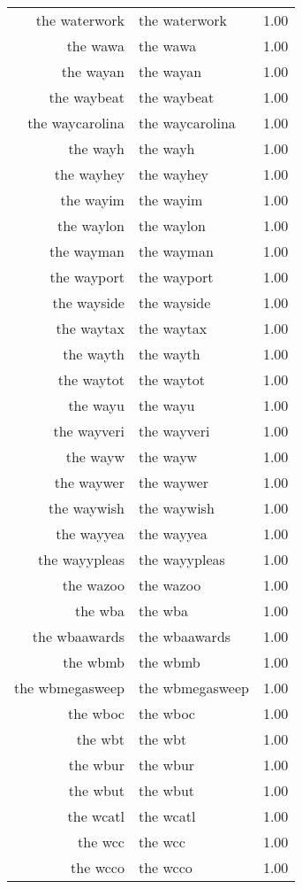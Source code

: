 \begin{table}[ht]
\begin{tabular}{rlr}
  the waterwork & the waterwork & 1.00 \\ 
  the wawa & the wawa & 1.00 \\ 
  the wayan & the wayan & 1.00 \\ 
  the waybeat & the waybeat & 1.00 \\ 
  the waycarolina & the waycarolina & 1.00 \\ 
  the wayh & the wayh & 1.00 \\ 
  the wayhey & the wayhey & 1.00 \\ 
  the wayim & the wayim & 1.00 \\ 
  the waylon & the waylon & 1.00 \\ 
  the wayman & the wayman & 1.00 \\ 
  the wayport & the wayport & 1.00 \\ 
  the wayside & the wayside & 1.00 \\ 
  the waytax & the waytax & 1.00 \\ 
  the wayth & the wayth & 1.00 \\ 
  the waytot & the waytot & 1.00 \\ 
  the wayu & the wayu & 1.00 \\ 
  the wayveri & the wayveri & 1.00 \\ 
  the wayw & the wayw & 1.00 \\ 
  the waywer & the waywer & 1.00 \\ 
  the waywish & the waywish & 1.00 \\ 
  the wayyea & the wayyea & 1.00 \\ 
  the wayypleas & the wayypleas & 1.00 \\ 
  the wazoo & the wazoo & 1.00 \\ 
  the wba & the wba & 1.00 \\ 
  the wbaawards & the wbaawards & 1.00 \\ 
  the wbmb & the wbmb & 1.00 \\ 
  the wbmegasweep & the wbmegasweep & 1.00 \\ 
  the wboc & the wboc & 1.00 \\ 
  the wbt & the wbt & 1.00 \\ 
  the wbur & the wbur & 1.00 \\ 
  the wbut & the wbut & 1.00 \\ 
  the wcatl & the wcatl & 1.00 \\ 
  the wcc & the wcc & 1.00 \\ 
  the wcco & the wcco & 1.00 \\ 

\end{tabular}
\end{table}
